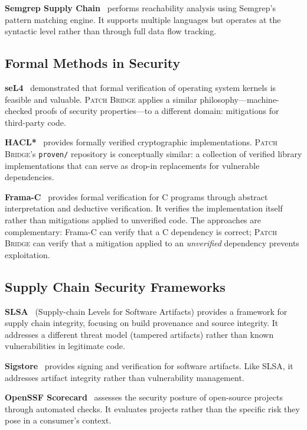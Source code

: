 \documentclass[11pt,twocolumn]{article}
\begin{document}
\textbf{Semgrep Supply Chain}~\cite{semgrep} performs reachability
analysis using Semgrep's pattern matching engine. It supports
multiple languages but operates at the syntactic level rather than
through full data flow tracking.

\subsection{Formal Methods in Security}

\textbf{seL4}~\cite{sel4} demonstrated that formal verification of
operating system kernels is feasible and valuable. \textsc{Patch Bridge}
applies a similar philosophy---machine-checked proofs of security
properties---to a different domain: mitigations for third-party code.

\textbf{HACL*}~\cite{hacl-star} provides formally verified
cryptographic implementations. \textsc{Patch Bridge}'s
\texttt{proven/} repository is conceptually similar: a collection of
verified library implementations that can serve as drop-in replacements
for vulnerable dependencies.

\textbf{Frama-C}~\cite{frama-c} provides formal verification
for C programs through abstract interpretation and deductive
verification. It verifies the implementation itself rather than
mitigations applied to unverified code. The approaches are
complementary: Frama-C can verify that a C dependency is correct;
\textsc{Patch Bridge} can verify that a mitigation applied to an
\emph{unverified} dependency prevents exploitation.

\subsection{Supply Chain Security Frameworks}

\textbf{SLSA}~\cite{slsa} (Supply-chain Levels for Software Artifacts)
provides a framework for supply chain integrity, focusing on build
provenance and source integrity. It addresses a different threat model
(tampered artifacts) rather than known vulnerabilities in legitimate
code.

\textbf{Sigstore}~\cite{sigstore} provides signing and verification
for software artifacts. Like SLSA, it addresses artifact integrity
rather than vulnerability management.

\textbf{OpenSSF Scorecard}~\cite{scorecard} assesses the security
posture of open-source projects through automated checks. It evaluates
projects rather than the specific risk they pose in a consumer's
context.
\end{document}
